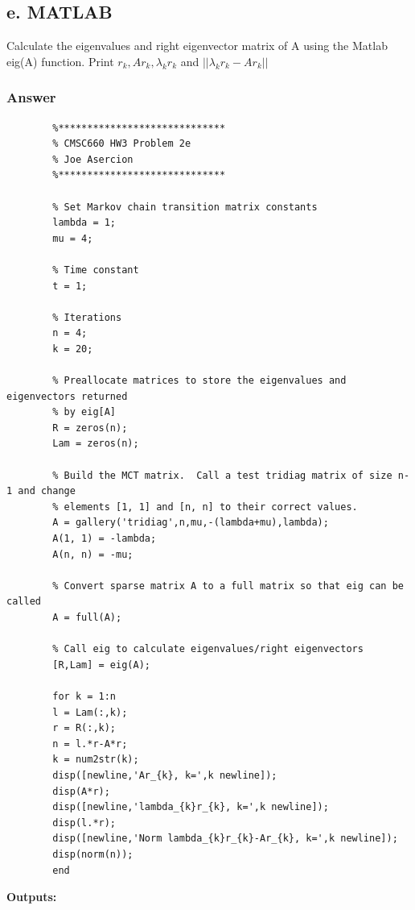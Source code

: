 \documentclass{article}
\newcommand{\n}{\newline}
\begin{document}
		\newpage
		\subsection{e. MATLAB}
		Calculate the eigenvalues and right eigenvector matrix of A using the Matlab eig(A) function.  Print $r_{k},Ar_{k},\lambda_{k}r_{k}$ and $||\lambda_{k}r_{k}-Ar_{k}||$  
		\subsubsection{Answer}
		\begin{lstlisting}
		%*****************************
		% CMSC660 HW3 Problem 2e
		% Joe Asercion
		%***************************** 
		
		% Set Markov chain transition matrix constants
		lambda = 1;
		mu = 4;
		
		% Time constant
		t = 1;
		
		% Iterations
		n = 4;
		k = 20;
		
		% Preallocate matrices to store the eigenvalues and eigenvectors returned 
		% by eig[A]
		R = zeros(n);
		Lam = zeros(n);
		
		% Build the MCT matrix.  Call a test tridiag matrix of size n-1 and change
		% elements [1, 1] and [n, n] to their correct values.
		A = gallery('tridiag',n,mu,-(lambda+mu),lambda);
		A(1, 1) = -lambda;
		A(n, n) = -mu;
		
		% Convert sparse matrix A to a full matrix so that eig can be called
		A = full(A);
		
		% Call eig to calculate eigenvalues/right eigenvectors
		[R,Lam] = eig(A);
		
		for k = 1:n
		l = Lam(:,k);
		r = R(:,k);
		n = l.*r-A*r;
		k = num2str(k);
		disp([newline,'Ar_{k}, k=',k newline]);
		disp(A*r);
		disp([newline,'lambda_{k}r_{k}, k=',k newline]);
		disp(l.*r);
		disp([newline,'Norm lambda_{k}r_{k}-Ar_{k}, k=',k newline]);
		disp(norm(n));
		end
		\end{lstlisting}
		\textbf{Outputs:\n}
\end{document}
